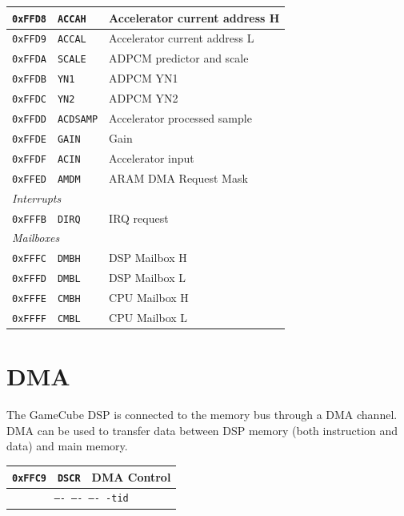 \documentclass[oneside,english,a4paper,10pt,oneside,openany,final]{memoir}
\newcommand{\Address}[1]{\texttt{#1}}
\newcommand{\Register}[1]{\texttt{#1}}
\newcommand{\RegisterBitOverview}[4]{
  \begin{table}[H]
  \centering
  \begin{tabular}{|lcr|}
  \hline
  \Address{#1} & \Register{#2} & {#3} \\ \hline
  \multicolumn{3}{|c|}{\texttt{#4}}   \\ \hline
  \end{tabular}
  \end{table}
}
\begin{document}
\begin{table}[htb]
\begin{tabular}{|l|l|l|}
\Address{0xFFD8} & \Register{ACCAH}   & Accelerator current address H \\ \hline
\Address{0xFFD9} & \Register{ACCAL}   & Accelerator current address L \\ \hline
\Address{0xFFDA} & \Register{SCALE}   & ADPCM predictor and scale     \\ \hline
\Address{0xFFDB} & \Register{YN1}     & ADPCM YN1                     \\ \hline
\Address{0xFFDC} & \Register{YN2}     & ADPCM YN2                     \\ \hline
\Address{0xFFDD} & \Register{ACDSAMP} & Accelerator processed sample  \\ \hline
\Address{0xFFDE} & \Register{GAIN}    & Gain                          \\ \hline
\Address{0xFFDF} & \Register{ACIN}    & Accelerator input             \\ \hline
\Address{0xFFED} & \Register{AMDM}    & ARAM DMA Request Mask         \\ \hline
\multicolumn{3}{|l|}{\textit{Interrupts}}                             \\ \hline
\Address{0xFFFB} & \Register{DIRQ}    & IRQ request                   \\ \hline
\multicolumn{3}{|l|}{\textit{Mailboxes}}                              \\ \hline
\Address{0xFFFC} & \Register{DMBH}    & DSP Mailbox H                 \\ \hline
\Address{0xFFFD} & \Register{DMBL}    & DSP Mailbox L                 \\ \hline
\Address{0xFFFE} & \Register{CMBH}    & CPU Mailbox H                 \\ \hline
\Address{0xFFFF} & \Register{CMBL}    & CPU Mailbox L                 \\ \hline
\end{tabular}
\end{table}

\pagebreak{}

\section{DMA}

The GameCube DSP is connected to the memory bus through a DMA channel. DMA can be used to transfer data between DSP memory (both instruction and data) and main memory.

\RegisterBitOverview{0xFFC9}{DSCR}{DMA Control}{---- ---- ---- -tid}
\end{document}
